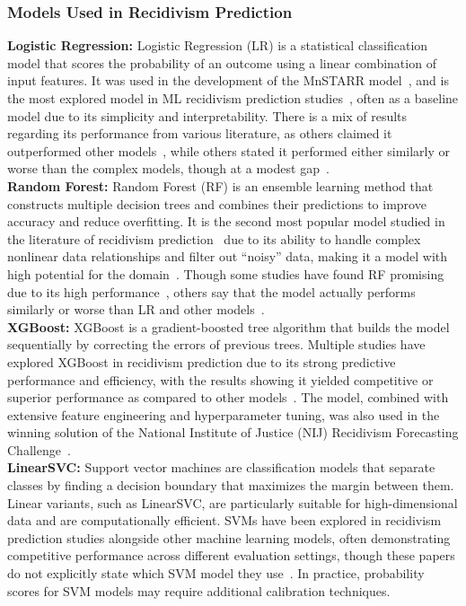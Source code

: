 \documentclass{article}
\begin{document}
\subsubsection*{Models Used in Recidivism Prediction} %
\tab%
\textbf{Logistic Regression:} Logistic Regression (LR) is a statistical classification model that scores the probability of an outcome using a linear combination of input features. It was used in the development of the MnSTARR model~\cite{duwe2014development}, and is the most explored model in ML recidivism prediction studies~\cite{travaini2022machine}, often as a baseline model due to its simplicity and interpretability. There is a mix of results regarding its performance from various literature, as others claimed it outperformed other models~\cite{ngo2018traditional,karimi2021enhancing}, while others stated it performed either similarly or worse than the complex models, though at a modest gap~\cite{duwe2017out,kovalchuk2023prediction}.\\

\textbf{Random Forest:} Random Forest (RF) is an ensemble learning method that constructs multiple decision trees and combines their predictions to improve accuracy and reduce overfitting. It is the second most popular model studied in the literature of recidivism prediction~\cite{travaini2022machine} due to its ability to handle complex nonlinear data relationships and filter out ``noisy'' data, making it a model with high potential for the domain~\cite{tollenaar2013method,duwe2017out}. Though some studies have found RF promising due to its high performance~\cite{duwe2017out,kovalchuk2023prediction}, others say that the model actually performs similarly or worse than LR and other models~\cite{ozkan2017predicting,ngo2018traditional}. \\

\textbf{XGBoost:} XGBoost is a gradient-boosted tree algorithm that builds the model sequentially by correcting the errors of previous trees. Multiple studies have explored XGBoost in recidivism prediction due to its strong predictive performance and efficiency, with the results showing it yielded competitive or superior performance as compared to other models~\cite{won2019recidivism,rajendran2021predicting}. The model, combined with extensive feature engineering and hyperparameter tuning, was also used in the winning solution of the National Institute of Justice (NIJ) Recidivism Forecasting Challenge~\cite{han2022xgboost}. \\

\textbf{LinearSVC:} Support vector machines are classification models that separate classes by finding a decision boundary that maximizes the margin between them. Linear variants, such as LinearSVC, are particularly suitable for high-dimensional data and are computationally efficient. SVMs have been explored in recidivism prediction studies alongside other machine learning models, often demonstrating competitive performance across different evaluation settings, though these papers do not explicitly state which SVM model they use~\cite{duwe2017out, tolan2019machine,ozkan2017predicting}. In practice, probability scores for SVM models may require additional calibration techniques.
\end{document}
